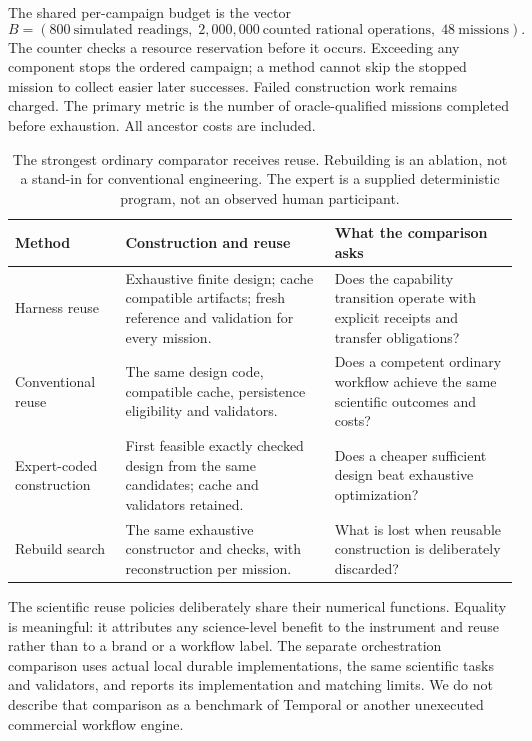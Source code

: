 \documentclass[11pt]{article}
\begin{document}
The shared per-campaign budget is the vector
\begin{equation}
B=(800\ \text{simulated readings},\;2{,}000{,}000\ \text{counted rational operations},\;48\ \text{missions}).
\label{eq:budget}
\end{equation}
The counter checks a resource reservation before it occurs. Exceeding any component stops the ordered campaign; a method cannot skip the stopped mission to collect easier later successes. Failed construction work remains charged. The primary metric is the number of oracle-qualified missions completed before exhaustion. All ancestor costs are included.

\begin{table}[htbp]
\centering\small
\begin{tabularx}{\linewidth}{P{.22\linewidth}Y Y}
\toprule
\textbf{Method} & \textbf{Construction and reuse} & \textbf{What the comparison asks}\\
\midrule
Harness reuse & Exhaustive finite design; cache compatible artifacts; fresh reference and validation for every mission. & Does the capability transition operate with explicit receipts and transfer obligations?\\
Conventional reuse & The same design code, compatible cache, persistence eligibility and validators. & Does a competent ordinary workflow achieve the same scientific outcomes and costs?\\
Expert-coded construction & First feasible exactly checked design from the same candidates; cache and validators retained. & Does a cheaper sufficient design beat exhaustive optimization?\\
Rebuild search & The same exhaustive constructor and checks, with reconstruction per mission. & What is lost when reusable construction is deliberately discarded?\\
\bottomrule
\end{tabularx}
\caption{The strongest ordinary comparator receives reuse. Rebuilding is an ablation, not a stand-in for conventional engineering. The expert is a supplied deterministic program, not an observed human participant.}
\label{tab:comparators}
\end{table}

The scientific reuse policies deliberately share their numerical functions. Equality is meaningful: it attributes any science-level benefit to the instrument and reuse rather than to a brand or a workflow label. The separate orchestration comparison uses actual local durable implementations, the same scientific tasks and validators, and reports its implementation and matching limits. We do not describe that comparison as a benchmark of Temporal or another unexecuted commercial workflow engine.
\end{document}
